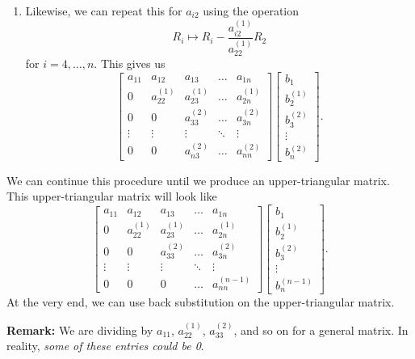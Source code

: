 \documentclass[letterpaper]{article}
\newcommand{\0}{\mathbf{0}}
\begin{document}
\begin{enumerate}
    \item Likewise, we can repeat this for $a_{i2}$ using the operation 
    \[R_i \mapsto R_i - \frac{a_{i2}^{(1)}}{a_{22}^{(1)}} R_2\]
    for $i = 4, \hdots, n$. This gives us 
    \[\begin{bmatrix}
        a_{11} & a_{12} & a_{13} & \hdots & a_{1n} \\ 
        0      & a_{22}^{(1)} & a_{23}^{(1)} & \hdots & a_{2n}^{(1)} \\ 
        0      & 0       & a_{33}^{(2)} & \hdots & a_{3n}^{(2)} \\ 
        \vdots & \vdots & \vdots & \ddots & \vdots \\ 
        0      & 0       & a_{n3}^{(2)} & \hdots & a_{nn}^{(2)}
    \end{bmatrix} \begin{bmatrix}
        b_1 \\ b_2^{(1)} \\ b_3^{(2)} \\ \vdots \\ b_n^{(2)}
    \end{bmatrix}.\]
\end{enumerate}

We can continue this procedure until we produce an upper-triangular matrix. This upper-triangular matrix will look like 
\[\begin{bmatrix}
    a_{11} & a_{12} & a_{13} & \hdots & a_{1n} \\ 
    0      & a_{22}^{(1)} & a_{23}^{(1)} & \hdots & a_{2n}^{(1)} \\ 
    0      & 0       & a_{33}^{(2)} & \hdots & a_{3n}^{(2)} \\ 
    \vdots & \vdots & \vdots & \ddots & \vdots \\ 
    0      & 0       & 0            & \hdots & a_{nn}^{(n - 1)}
\end{bmatrix} \begin{bmatrix}
    b_1 \\ b_2^{(1)} \\ b_3^{(2)} \\ \vdots \\ b_n^{(n - 1)}
\end{bmatrix}.\]
At the very end, we can use back substitution on the upper-triangular matrix. 

\bigskip 

\textbf{Remark:} We are dividing by $a_{11}$, $a_{22}^{(1)}$, $a_{33}^{(2)}$, and so on for a general matrix. In reality, \emph{some of these entries could be 0}. 
\end{document}
